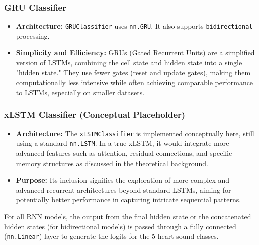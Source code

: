 \documentclass[a4paper]{article}
\begin{document}
\begin{multicols}{2}
\subsubsection{GRU Classifier}
\begin{itemize}
    \item \textbf{Architecture:} \texttt{GRUClassifier} uses \texttt{nn.GRU}. It also supports \texttt{bidirectional} processing.
    \item \textbf{Simplicity and Efficiency:} GRUs (Gated Recurrent Units) are a simplified version of LSTMs, combining the cell state and hidden state into a single "hidden state." They use fewer gates (reset and update gates), making them computationally less intensive while often achieving comparable performance to LSTMs, especially on smaller datasets.
\end{itemize}

\subsubsection{xLSTM Classifier (Conceptual Placeholder)}
\begin{itemize}
    \item \textbf{Architecture:} The \texttt{xLSTMClassifier} is implemented conceptually here, still using a standard \texttt{nn.LSTM}. In a true xLSTM, it would integrate more advanced features such as attention, residual connections, and specific memory structures as discussed in the theoretical background.
    \item \textbf{Purpose:} Its inclusion signifies the exploration of more complex and advanced recurrent architectures beyond standard LSTMs, aiming for potentially better performance in capturing intricate sequential patterns.
\end{itemize}

For all RNN models, the output from the final hidden state or the concatenated hidden states (for bidirectional models) is passed through a fully connected (\texttt{nn.Linear}) layer to generate the logits for the 5 heart sound classes.


\end{multicols}
\end{document}
